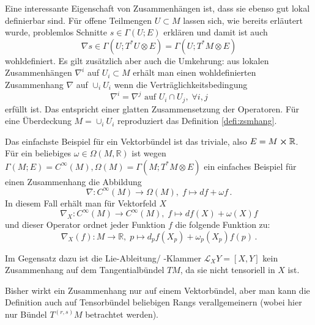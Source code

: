 Eine interessante Eigenschaft von Zusammenhängen ist, dass sie ebenso gut lokal definierbar sind. Für offene Teilmengen $U \subset M$ lassen sich, wie bereits erläutert wurde, problemlos Schnitte $s \in \Gamma(U; E)$ erklären und damit ist auch
\begin{equation}
\nabla s \in \Gamma(U; T^*U \otimes E) = \Gamma(U; T^*M \otimes E)
\end{equation}
wohldefiniert. Es gilt zusätzlich aber auch die Umkehrung: aus lokalen Zusammenhängen $\nabla^i$ auf $U_i \subset M$ erhält man einen wohldefinierten Zusammenhang $\nabla$ auf $\cup_i U_i$ wenn die Verträglichkeitsbedingung
\begin{equation}
\nabla^i = \nabla^j \text{ auf } U_i \cap U_j, \; \forall i, j
\end{equation}
erfüllt ist. Das entspricht einer glatten Zusammensetzung der Operatoren. Für eine Überdeckung $M = \cup_i U_i$ reproduziert das Definition \ref{defi:zsmhang}.



\begin{bsp}
Das einfachste Beispiel für ein Vektorbündel ist das triviale, also $E = M \cross \mathbb{R}$. Für ein beliebiges $\omega \in \Omega(M, \mathbb{R})$ ist wegen $\Gamma(M; E) = C^\infty(M), \Omega(M) = \Gamma(M; T^* M \otimes E)$ ein einfaches Beispiel für einen Zusammenhang die Abbildung
\begin{equation*}
\nabla: C^\infty(M) \rightarrow \Omega(M), \; f \mapsto df + \omega f \, .
\end{equation*}
In diesem Fall erhält man für Vektorfeld $X$
\begin{equation*}
\nabla_X: C^\infty(M) \rightarrow C^\infty(M), \; f \mapsto df(X) + \omega(X) f
\end{equation*}
und dieser Operator ordnet jeder Funktion $f$ die folgende Funktion zu:
\begin{equation*}
\nabla_X(f): M \rightarrow \mathbb{R}, \; p \mapsto d_p f(X_p) + \omega_p(X_p) f(p) \, .
\end{equation*}

Im Gegensatz dazu ist die Lie-Ableitung/ -Klammer $\mathcal{L}_X Y = [X, Y]$ kein Zusammenhang auf dem Tangentialbündel $TM$, da sie nicht tensoriell in $X$ ist.
\end{bsp}



Bisher wirkt ein Zusammenhang nur auf einem Vektorbündel, aber man kann die Definition auch auf Tensorbündel beliebigen Rangs verallgemeinern (wobei hier nur Bündel $T^{(r, s)}M$ betrachtet werden).

